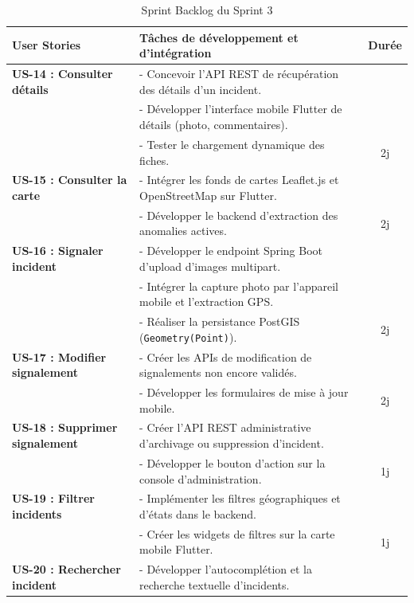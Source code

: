 \begin{table}[H]
    \centering
    \caption{Sprint Backlog du Sprint 3}
    \label{tab:backlog_sprint3}
    \vspace{0.2cm}
    \scriptsize
    \begin{tabularx}{\textwidth}{|l|X|c|}
        \hline
        \textbf{User Stories} & \textbf{Tâches de développement et d'intégration} & \textbf{Durée} \\ \hline
        \textbf{US-14 : Consulter détails} & 
        - Concevoir l'API REST de récupération des détails d'un incident.\\
        & - Développer l'interface mobile Flutter de détails (photo, commentaires).\\
        & - Tester le chargement dynamique des fiches. & 2j \\ \hline
        \textbf{US-15 : Consulter la carte} &
        - Intégrer les fonds de cartes Leaflet.js et OpenStreetMap sur Flutter.\\
        & - Développer le backend d'extraction des anomalies actives. & 2j \\ \hline
        \textbf{US-16 : Signaler incident} &
        - Développer le endpoint Spring Boot d'upload d'images multipart.\\
        & - Intégrer la capture photo par l'appareil mobile et l'extraction GPS.\\
        & - Réaliser la persistance PostGIS (\texttt{Geometry(Point)}). & 2j \\ \hline
        \textbf{US-17 : Modifier signalement} &
        - Créer les APIs de modification de signalements non encore validés.\\
        & - Développer les formulaires de mise à jour mobile. & 2j \\ \hline
        \textbf{US-18 : Supprimer signalement} &
        - Créer l'API REST administrative d'archivage ou suppression d'incident.\\
        & - Développer le bouton d'action sur la console d'administration. & 1j \\ \hline
        \textbf{US-19 : Filtrer incidents} &
        - Implémenter les filtres géographiques et d'états dans le backend.\\
        & - Créer les widgets de filtres sur la carte mobile Flutter. & 1j \\ \hline
        \textbf{US-20 : Rechercher incident} &
        - Développer l'autocomplétion et la recherche textuelle d'incidents.\\

\end{tabularx}
\end{table}
